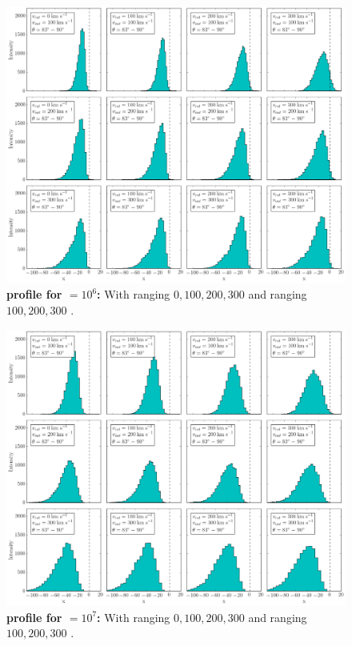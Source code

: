 \begin{figure}[h!]
	\begin{center}
		\includegraphics[width=1\textwidth]{./figures/chapter3/1_tau10E6_phi83-90}
	\end{center}
	\caption{\textbf{\lya profile for \tauh$=10^6$:} With \vrot ranging $0,100,200,300$ \kms and \vout ranging $100,200,300$ \kms.
		\label{fig:1_tau10E6_phi83-90}}
\end{figure}

\newpage

\begin{figure}[h!]
	\begin{center}
		\includegraphics[width=1\textwidth]{./figures/chapter3/1_tau10E7_phi83-90}
	\end{center}
	\caption{\textbf{\lya profile for \tauh$=10^7$:} With \vrot ranging $0,100,200,300$ \kms and \vout ranging $100,200,300$ \kms.
		\label{fig:1_tau10E7_phi83-90}}
\end{figure}

